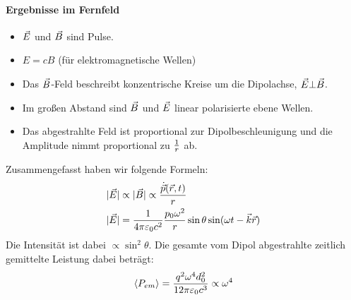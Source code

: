 
\paragraph{Ergebnisse im Fernfeld}
\begin{itemize}
	\item $\vec{E}$ und $\vec{B}$ sind Pulse.
	\item $E=cB$ (für elektromagnetische Wellen)
	\item Das $\vec{B}$-Feld beschreibt konzentrische Kreise um die
      Dipolachse, $\vec{E}\bot\vec{B}$.
	\item Im großen Abstand sind $\vec{B}$ und $\vec{E}$ linear
      polarisierte ebene Wellen.
	\item Das abgestrahlte Feld ist proportional zur
      Dipolbeschleunigung und die Amplitude nimmt proportional zu
      $\frac{1}{r}$ ab.
\end{itemize}
Zusammengefasst haben wir folgende Formeln:
\begin{align*}
  \vert \vec{E}\vert
  &\propto\vert\vec{B}\vert\propto\frac{\dot{\vec{p}}(\vec{r},t)}{r}\\
  \vert\vec{E}\vert
  &=\frac{1}{4\pi\varepsilon_0 c^2} \frac{p_0\omega^2}{r}
    \sin\theta \sin(\omega t-\vec{k}\vec{r})
\end{align*}
Die Intensität ist dabei $\propto\sin^2\theta$. Die gesamte vom Dipol
abgestrahlte zeitlich gemittelte Leistung dabei beträgt: 
\begin{align*}
	\langle P_{em}\rangle
  =\frac{q^2\omega^4 d_0^2}{12\pi\varepsilon_0 c^3}
  \propto\omega^4 
\end{align*}


